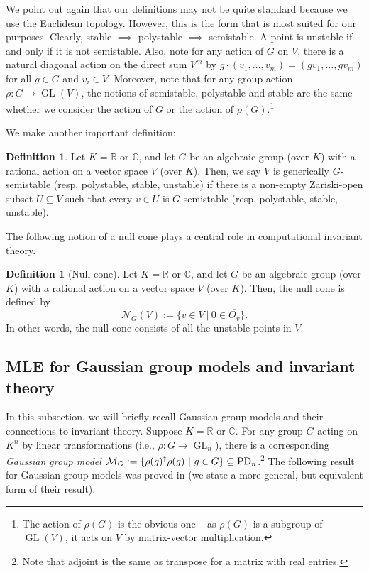 \documentclass[11pt]{amsart}
\theoremstyle{definition}
\newtheorem{definition}[theorem]{Definition}
\newcommand{\R}{{\mathbb R}}
\newcommand{\PD} {{\rm PD}}
\newcommand{\C}{{\mathbb C}}
\newcommand{\GL}{\operatorname{GL}}
\begin{document}
We point out again that our definitions may not be quite standard because we use the Euclidean topology. However, this is the form that is most suited for our purposes. Clearly, stable $\implies$ polystable $\implies$ semistable. A point is unstable if and only if it is not semistable. Also, note for any action of $G$ on $V$, there is a natural diagonal action on the direct sum $V^m$ by $g\cdot (v_1,\dots,v_m) = (gv_1,\dots,gv_m)$ for all $g \in G$ and $v_i \in V$. Moreover, note that for any group action $\rho: G\rightarrow \GL(V)$, the notions of semistable, polystable and stable are the same whether we consider the action of $G$ or the action of $\rho(G)$.\footnote{The action of $\rho(G)$ is the obvious one -- as $\rho(G)$ is a subgroup of $\GL(V)$, it acts on $V$ by matrix-vector multiplication.}


We make another important definition:

\begin{definition} \label{defn.gen.stable}
Let $K = \R$ or $\C$, and let $G$ be an algebraic group (over $K$) with a rational action on a vector space $V$ (over $K$). Then, we say $V$ is generically $G$-semistable (resp. polystable, stable, unstable) if there is a non-empty Zariski-open subset $U \subseteq V$ such that every $v \in U$ is $G$-semistable (resp. polystable, stable, unstable).
\end{definition}


The following notion of a null cone plays a central role in computational invariant theory.

\begin{definition} [Null cone] \label{defn.nullcone}
Let $K = \R$ or $\C$, and let $G$ be an algebraic group (over $K$) with a rational action on a vector space $V$ (over $K$). Then, the null cone is defined by
$$
\mathcal{N}_G(V) := \{v \in V\ |\ 0 \in \overline{O_v}\}.
$$
In other words, the null cone consists of all the unstable points in $V$.
\end{definition}




\subsection{MLE for Gaussian group models and invariant theory}
In this subsection, we will briefly recall Gaussian group models and their connections to invariant theory. Suppose $K = \R$ or $\C$. For any group $G$ acting on $K^n$ by linear transformations (i.e., $\rho: G \rightarrow \GL_n$), there is a corresponding {\em Gaussian group model} $\mathcal{M}_G := \{\rho(g)^\dag  \rho(g)\ |\ g \in G\} \subseteq \PD_n$.\footnote{Note that adjoint is the same as transpose for a matrix with real entries.} The following result for Gaussian group models was proved in \cite{AKRS} (we state a more general, but equivalent form of their result). 
\end{document}
